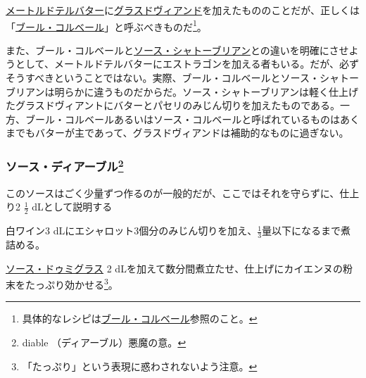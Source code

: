 \begin{recette}

 

\protect\hyperlink{beurre-maitre-d-hotel}{メートルドテルバター}に\protect\hyperlink{glace-de-viande}{グラスドヴィアンド}を加えたもののことだが、正しくは「\protect\hyperlink{beurre-colbert}{ブール・コルベール}」と呼ぶべきものだ\footnote{具体的なレシピは\protect\hyperlink{beurre-colbert}{ブール・コルベール}参照のこと。}。

また、ブール・コルベールと\protect\hyperlink{sauce-chateaubriand}{ソース・シャトーブリアン}との違いを明確にさせようとして、メートルドテルバターにエストラゴンを加える者もいる。だが、必ずそうすべきということではない。実際、ブール・コルベールとソース・シャトーブリアンは明らかに違うものだからだ。ソース・シャトーブリアンは軽く仕上げたグラスドヴィアントにバターとパセリのみじん切りを加えたものである。一方、ブール・コルベールあるいはソース・コルベールと呼ばれているものはあくまでもバターが主であって、グラスドヴィアンドは補助的なものに過ぎない。

\atoaki{}

\hypertarget{sauce-diable}{%
\subsubsection[ソース・ディアーブル]{\texorpdfstring{ソース・ディアーブル\footnote{diable
  （ディアーブル）悪魔の意。}}{ソース・ディアーブル}}\label{sauce-diable}}


 

このソースはごく少量ずつ作るのが一般的だが、ここではそれを守らずに、仕上り2
\(\frac{1}{2}\) dLとして説明する

白ワイン3
dLにエシャロット3個分のみじん切りを加え、\(\frac{1}{3}\)量以下になるまで煮詰める。

\protect\hyperlink{sauce-demi-glace}{ソース・ドゥミグラス} 2
dLを加えて数分間煮立たせ、仕上げにカイエンヌの粉末をたっぷり効かせる\footnote{「たっぷり」という表現に惑わされないよう注意。}。


\end{recette}
